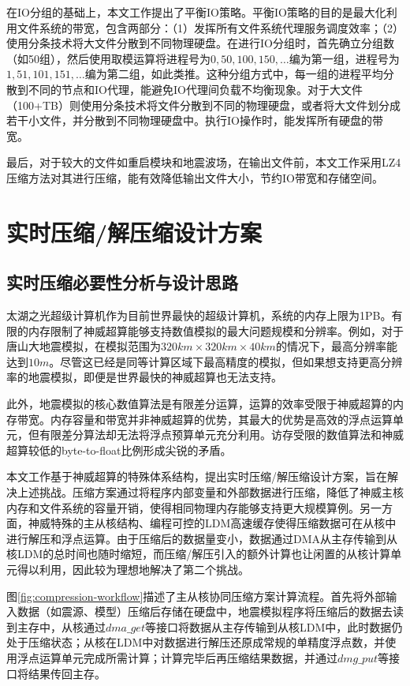 \documentclass[degree=doctor]{thuthesis}
\begin{document}
在IO分组的基础上，本文工作提出了平衡IO策略。平衡IO策略的目的是最大化利用文件系统的带宽，包含两部分：（1）发挥所有文件系统代理服务调度效率；（2）使用分条技术将大文件分散到不同物理硬盘。在进行IO分组时，首先确立分组数（如50组），然后使用取模运算将进程号为$0,50,100,150,\ldots$编为第一组，进程号为$1,51,101,151,\ldots$编为第二组，如此类推。这种分组方式中，每一组的进程平均分散到不同的节点和IO代理，能避免IO代理间负载不均衡现象。对于大文件（100+TB）则使用分条技术将文件分散到不同的物理硬盘，或者将大文件划分成若干小文件，并分散到不同物理硬盘中。执行IO操作时，能发挥所有硬盘的带宽。

最后，对于较大的文件如重启模块和地震波场，在输出文件前，本文工作采用LZ4压缩方法对其进行压缩，能有效降低输出文件大小，节约IO带宽和存储空间。

\section{实时压缩/解压缩设计方案}
\label{sec:实时压缩/解压缩设计方案}
\subsection{实时压缩必要性分析与设计思路}

太湖之光超级计算机作为目前世界最快的超级计算机，系统的内存上限为1PB。有限的内存限制了神威超算能够支持数值模拟的最大问题规模和分辨率。例如，对于唐山大地震模拟，在模拟范围为$320km\times 320km \times 40km$的情况下，最高分辨率能达到$10m$。尽管这已经是同等计算区域下最高精度的模拟，但如果想支持更高分辨率的地震模拟，即便是世界最快的神威超算也无法支持。

此外，地震模拟的核心数值算法是有限差分运算，运算的效率受限于神威超算的内存带宽。内存容量和带宽并非神威超算的优势，其最大的优势是高效的浮点运算单元，但有限差分算法却无法将浮点预算单元充分利用。访存受限的数值算法和神威超算较低的byte-to-float比例形成尖锐的矛盾。

本文工作基于神威超算的特殊体系结构，提出实时压缩/解压缩设计方案，旨在解决上述挑战。压缩方案通过将程序内部变量和外部数据进行压缩，降低了神威主核内存和文件系统的容量开销，使得相同物理内存能够支持更大规模算例。另一方面，神威特殊的主从核结构、编程可控的LDM高速缓存使得压缩数据可在从核中进行解压和浮点运算。由于压缩后的数据量变小，数据通过DMA从主存传输到从核LDM的总时间也随时缩短，而压缩/解压引入的额外计算也让闲置的从核计算单元得以利用，因此较为理想地解决了第二个挑战。

图\ref{fig:compression-workflow}描述了主从核协同压缩方案计算流程。首先将外部输入数据（如震源、模型）压缩后存储在硬盘中，地震模拟程序将压缩后的数据去读到主存中，从核通过$dma\_get$等接口将数据从主存传输到从核LDM中，此时数据仍处于压缩状态；从核在LDM中对数据进行解压还原成常规的单精度浮点数，并使用浮点运算单元完成所需计算；计算完毕后再压缩结果数据，并通过$dmg\_put$等接口将结果传回主存。
\end{document}
